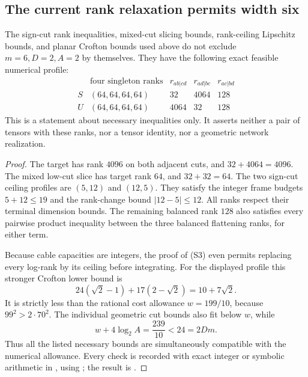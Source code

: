 \subsection{The current rank relaxation permits width six}

\begin{proposition}
\label{prop:width-six-rank-relaxation}
The sign-cut rank inequalities, mixed-cut slicing bounds,
rank-ceiling Lipschitz bounds, and planar Crofton bounds
used above do not exclude $m=6,D=2,A=2$ by themselves.
They have the following exact feasible numerical profile:
\[
\begin{array}{c|c|c|c|c}
 &\text{four singleton ranks}&r_{ab|cd}&r_{ad|bc}&r_{ac|bd}\\\hline
 S&(64,64,64,64)&32&4064&128\\
 U&(64,64,64,64)&4064&32&128
\end{array}
\]
This is a statement about necessary inequalities only.
It asserts neither a pair of tensors with these ranks,
nor a tensor identity, nor a geometric network realization.
\end{proposition}
\begin{proof}
The target has rank $4096$ on both adjacent cuts, and
$32+4064=4096$.  The mixed low-cut slice has target
rank $64$, and $32+32=64$.
The two sign-cut ceiling profiles are $(5,12)$ and
$(12,5)$.  They satisfy the integer frame budgets
$5+12\le19$ and the rank-change bound $|12-5|\le12$.
All ranks respect their terminal dimension bounds.
The remaining balanced rank $128$ also satisfies
every pairwise product inequality between the three
balanced flattening ranks, for either term.

Because cable capacities are integers, the proof of
(S3) even permits replacing every log-rank by its
ceiling before integrating.  For the displayed profile
this stronger Crofton lower bound is
\[
 24(\sqrt2-1)+17(2-\sqrt2)=10+7\sqrt2.
\]
It is strictly less than the rational cost allowance
$w=199/10$, because $99^2>2\cdot70^2$.
The individual geometric cut bounds also fit below
$w$, while
\[
 w+4\log_2 A=\frac{239}{10}<24=2Dm.
\]
Thus all the listed necessary bounds are simultaneously
compatible with the numerical allowance.  Every check
is recorded with exact integer or symbolic arithmetic in
, using
; the result
is .
\end{proof}

